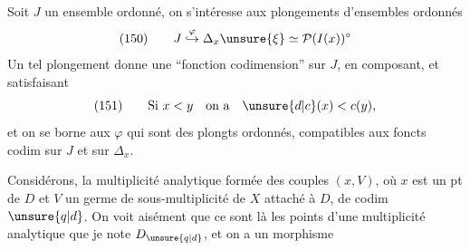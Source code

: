 Soit $J$ un ensemble ordonné, on s'intéresse aux plongements d'ensembles ordonnés
\[
(150)\qquad J\mathrel{\overset{\varphi}{\hookrightarrow}}\Delta_x\unsure{\xi}\simeq\mathcal P(I(x))^\circ
\]
Un tel plongement donne une ``fonction codimension'' sur $J$, en composant,  et  satisfaisant
\[
(151)\qquad\text{Si }x<y\quad\text{on a}\quad\unsure{d|c}(x)<c(y),
\]
et on se borne aux $\varphi$ qui sont des plongts ordonnés, compatibles aux foncts codim sur $J$ et sur $\Delta_x$.

Considérons,  la multiplicité analytique formée des couples $(x,V)$, où $x$ est un pt de $D$ et $V$ un germe de sous-multiplicité de $X$ attaché à $D$, de codim $\unsure{q|d}$. On  voit aisément que ce sont  là les points d'une multiplicité analytique que je note $D_{\unsure{q|d}}$, et on a un morphisme
